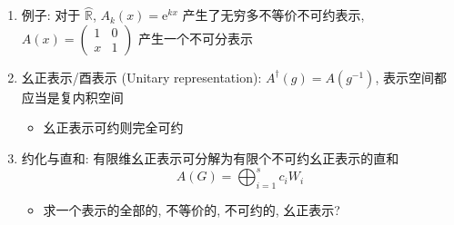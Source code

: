 \documentclass[12pt,a4paper]{article}%
\numberwithin{equation}{section}%
\newcommand\e{\mathrm{e}}%
\begin{document}
\begin{enumerate}
	\item 例子: 对于 $\wideparen{\mathbb R}$, $A_k(x) = \e^{kx}$ 产生了无穷多不等价不可约表示, $A(x) = \left(\begin{smallmatrix}
			1 & 0 \\
			x & 1
		\end{smallmatrix}\right)$ 产生一个不可分表示
	\item 幺正表示/酉表示 (Unitary representation): $A^\dagger(g) = A(g^{-1})$, 表示空间都应当是复内积空间
	\begin{itemize}
		\item 幺正表示可约则完全可约
	\end{itemize}
	\item 约化与直和: 有限维幺正表示可分解为有限个不可约幺正表示的直和
	\begin{equation}
		A(G) = \bigoplus_{i=1}^s c_iW_i
	\end{equation}
	\begin{itemize}
		\item 求一个表示的全部的, 不等价的, 不可约的, 幺正表示?
	\end{itemize}
\end{enumerate}
\end{document}
